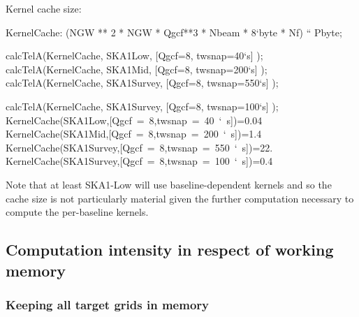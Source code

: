 \documentclass[useAMS,usenatbib,referee]{article}
\begin{document}
Kernel cache size:
\begin{maxima}[]
KernelCache: (NGW ** 2 * NGW * Qgcf**3 * Nbeam * 8`byte *  Nf) `` Pbyte;

calcTelA(KernelCache, SKA1Low,  [Qgcf=8, twsnap=40`s] );
calcTelA(KernelCache, SKA1Mid,  [Qgcf=8, twsnap=200`s] );
calcTelA(KernelCache, SKA1Survey,  [Qgcf=8, twsnap=550`s] );

calcTelA(KernelCache, SKA1Survey,  [Qgcf=8, twsnap=100`s] );
\maximaoutput*
{}\; \\
\m  \mbox{{}KernelCache(SKA1Low,[Qgcf = 8,twsnap = 40 ` s]){}}=0.04 \\
\m  \mbox{{}KernelCache(SKA1Mid,[Qgcf = 8,twsnap = 200 ` s]){}}=1.4 \\
\m  \mbox{{}KernelCache(SKA1Survey,[Qgcf = 8,twsnap = 550 ` s]){}}=22. \\
\m  \mbox{{}KernelCache(SKA1Survey,[Qgcf = 8,twsnap = 100 ` s]){}}=0.4 \\
\end{maxima}
Note that at least SKA1-Low will use baseline-dependent kernels and so
the cache size is not particularly material given the further
computation necessary to compute the per-baseline kernels.

\subsection{Computation intensity in respect of working memory}

\subsubsection{Keeping all target grids in memory}
\end{document}
